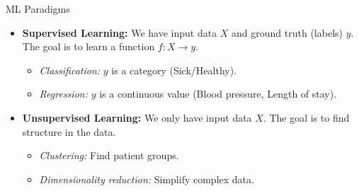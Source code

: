 \documentclass[aspectratio=169]{beamer}
\begin{document}
\begin{frame}{ML Paradigms}
    \begin{itemize}
        \item \textbf{Supervised Learning:}
        We have input data $X$ and ground truth (labels) $y$. The goal is to learn a function $f: X \rightarrow y$.
        \begin{itemize}
            \item \textit{Classification:} $y$ is a category (Sick/Healthy).
            \item \textit{Regression:} $y$ is a continuous value (Blood pressure, Length of stay).
        \end{itemize}
        
        \item \textbf{Unsupervised Learning:}
        We only have input data $X$. The goal is to find structure in the data.
        \begin{itemize}
            \item \textit{Clustering:} Find patient groups.
            \item \textit{Dimensionality reduction:} Simplify complex data.
        \end{itemize}
    \end{itemize}
\end{frame}
\end{document}
